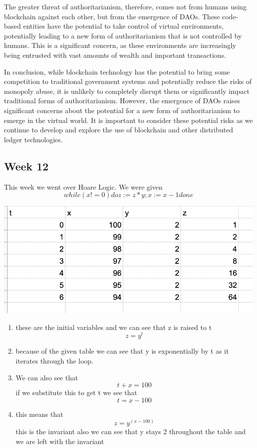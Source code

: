 \documentclass{article}
\theoremstyle{theorem}
\theoremstyle{definition}
\theoremstyle{remark}
\begin{document}
The greater threat of authoritarianism, therefore, comes not from humans using blockchain against each other, but from the emergence of DAOs. These code-based entities have the potential to take control of virtual environments, potentially leading to a new form of authoritarianism that is not controlled by humans. This is a significant concern, as these environments are increasingly being entrusted with vast amounts of wealth and important transactions.

In conclusion, while blockchain technology has the potential to bring some competition to traditional government systems and potentially reduce the risks of monopoly abuse, it is unlikely to completely disrupt them or significantly impact traditional forms of authoritarianism. However, the emergence of DAOs raises significant concerns about the potential for a new form of authoritarianism to emerge in the virtual world. It is important to consider these potential risks as we continue to develop and explore the use of blockchain and other distributed ledger technologies.
\subsection{Week 12}
This week we went over Hoare Logic. We were given \[ while (x!=0) do z:=z*y;  x:= x-1 done
 \]
 \begin{center}
 \includegraphics[scale=0.6]{hw12.jpg}
 \end{center}
 \begin{enumerate}
  \item  these are the initial variables and we can see that z is raised to t \[ z=y^t\]
   \item because of the given table we can see that y is exponentially by t as it iterates through the loop.
    \item We can also see that \[ t + x =100\] if we substitute this to get t we see that \[ t = x-100\]
    \item this means that \[ z=y^(x-100) \] this is the invariant also we can see that y stays 2 throughout the table and we are left with the invariant

\end{enumerate}
 
\end{document}
